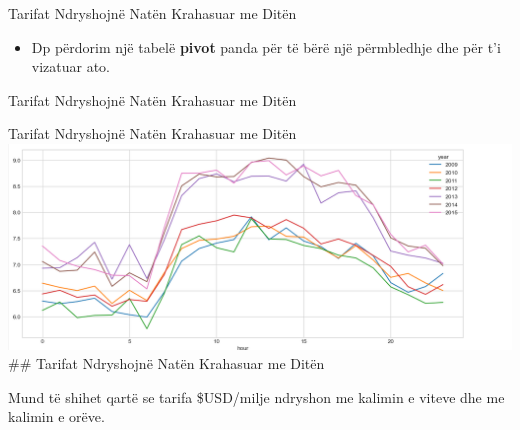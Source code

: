 \documentclass[
  ignorenonframetext,
]{beamer}
\newenvironment{Shaded}{\begin{snugshade}}{\end{snugshade}}
\newcommand{\DecValTok}[1]{\textcolor[rgb]{0.00,0.00,0.81}{#1}}
\newcommand{\NormalTok}[1]{#1}
\newcommand{\OperatorTok}[1]{\textcolor[rgb]{0.81,0.36,0.00}{\textbf{#1}}}
\newcommand{\StringTok}[1]{\textcolor[rgb]{0.31,0.60,0.02}{#1}}
\providecommand{\tightlist}{%
  \setlength{\itemsep}{0pt}\setlength{\parskip}{0pt}}
\begin{document}
\begin{frame}{Tarifat Ndryshojnë Natën Krahasuar me Ditën}
\protect\hypertarget{tarifat-ndryshojnuxeb-natuxebn-krahasuar-me-dituxebn-11}{}
\begin{itemize}
\tightlist
\item
  Dp përdorim një tabelë \textbf{pivot} panda për të bërë një
  përmbledhje dhe për t'i vizatuar ato.
\end{itemize}
\end{frame}

\begin{frame}[fragile]{Tarifat Ndryshojnë Natën Krahasuar me Ditën}
\protect\hypertarget{tarifat-ndryshojnuxeb-natuxebn-krahasuar-me-dituxebn-12}{}

\begin{Shaded}
\end{Shaded}
\end{frame}

\begin{frame}{Tarifat Ndryshojnë Natën Krahasuar me Ditën}
\protect\hypertarget{tarifat-ndryshojnuxeb-natuxebn-krahasuar-me-dituxebn-13}{}
\includegraphics{./Figs/train30.png} \#\# Tarifat Ndryshojnë Natën
Krahasuar me Ditën

Mund të shihet qartë se tarifa \$USD/milje ndryshon me kalimin e viteve
dhe me kalimin e orëve.
\end{frame}
\end{document}

